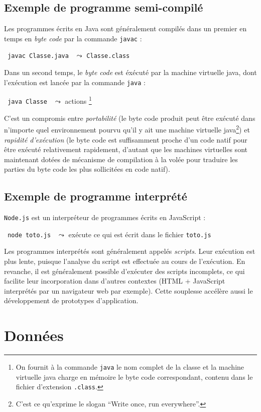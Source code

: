 \documentclass[a4paper,francais]{insalyon}
\begin{document}
\subsection{Exemple de programme semi-compilé}

Les programmes écrits en Java sont généralement compilés dans un premier en temps en \emph{byte code} par la commande \texttt{javac} :

\verb! javac Classe.java ! $\leadsto$ \texttt{Classe.class}

Dans un second temps, le \emph{byte code} est éxécuté par la machine virtuelle java, dont l'exécution est lancée par la commande \texttt{java} :

\verb! java Classe ! $\leadsto$ actions \footnote{On fournit à la commande \texttt{java} le nom complet de la classe et la machine virtuelle java charge en mémoire le byte code correspondant, contenu dans le fichier d'extension \texttt{.class}. }

C'est un compromis entre
\emph{portabilité} (le byte code produit peut être exécuté dans n'importe quel environnement pourvu qu'il y ait une machine virtuelle java\footnote{C'est ce qu'exprime le slogan ``Write once, run everywhere''.})
et \emph{rapidité d'exécution} (le byte code est suffisamment proche d'un code natif pour être exécuté relativement rapidement, d'autant que les machines virtuelles sont maintenant dotées de mécanisme de compilation à la volée pour traduire les parties du byte code les plus sollicitées en code natif).   

\subsection{Exemple de programme interprété}

\texttt{Node.js} est un interpréteur de programmes écrits en JavaScript :

\verb! node toto.js ! $\leadsto$ exécute ce qui est écrit dans le fichier \texttt{toto.js}

Les programmes interprétés sont généralement appelés \emph{scripts}. Leur exécution est plus lente, puisque l'analyse du script est effectuée au cours de l'exécution. En revanche, il est généralement possible d'exécuter des scripts incomplets, ce qui facilite leur incorporation dans d'autres contextes (HTML + JavaScript interprétés par un navigateur web par exemple). Cette souplesse accélère aussi le développement de prototypes d'application.


\section{Données}
\end{document}

